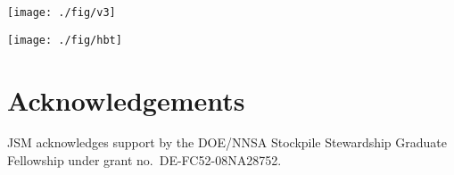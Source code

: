 \documentclass[aps,prc,reprint,amsmath,nofootinbib,superscriptaddress]{revtex4-1}
\begin{document}
\begin{figure*}[t]
  \texttt{[image: ./fig/v3]}
  \caption{
    \label{fig:spectra}
  }
\end{figure*}

\begin{figure*}[t]
  \texttt{[image: ./fig/hbt]}
  \caption{
    \label{fig:spectra}
  }
\end{figure*}


\section{Acknowledgements}

\medskip
JSM acknowledges support by the DOE/NNSA Stockpile Stewardship Graduate Fellowship under grant no.~DE-FC52-08NA28752.


\end{document}
